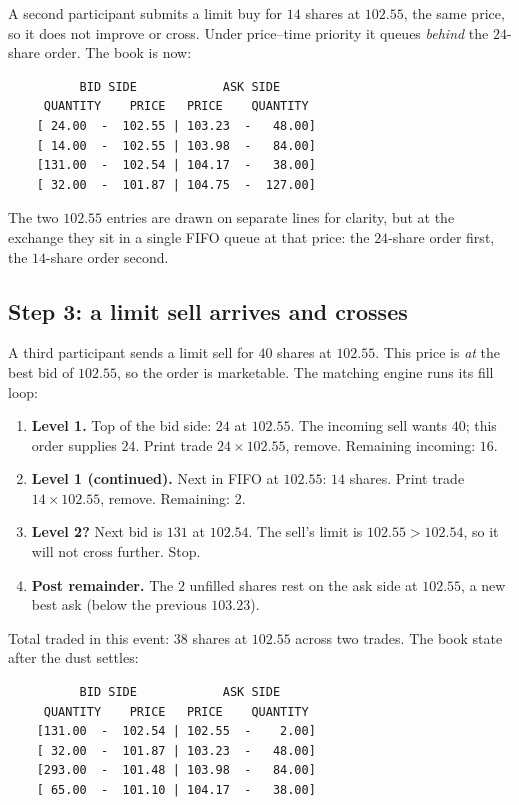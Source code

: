 A second participant submits a limit buy for $14$ shares at
$102.55$, the same price, so it does not improve or cross. Under price--time
priority it queues \emph{behind} the $24$-share order. The book is
now:

\begin{verbatim}
          BID SIDE            ASK SIDE
     QUANTITY    PRICE   PRICE    QUANTITY
    [ 24.00  -  102.55 | 103.23  -   48.00]
    [ 14.00  -  102.55 | 103.98  -   84.00]
    [131.00  -  102.54 | 104.17  -   38.00]
    [ 32.00  -  101.87 | 104.75  -  127.00]
\end{verbatim}

The two $102.55$ entries are drawn on separate lines for clarity, but
at the exchange they sit in a single FIFO queue at that price: the
$24$-share order first, the $14$-share order second.

\subsection{Step 3: a limit sell arrives and crosses}

A third participant sends a limit sell for $40$ shares at $102.55$.
This price is \emph{at} the best bid of $102.55$, so the order is
marketable. The matching engine runs its fill loop:

\begin{enumerate}
  \item \textbf{Level 1.} Top of the bid side: $24$ at $102.55$. The
  incoming sell wants $40$; this order supplies $24$. Print trade
  $24 \times 102.55$, remove. Remaining incoming: $16$.
  \item \textbf{Level 1 (continued).} Next in FIFO at $102.55$: $14$
  shares. Print trade $14 \times 102.55$, remove. Remaining: $2$.
  \item \textbf{Level 2?} Next bid is $131$ at $102.54$. The sell's
  limit is $102.55 > 102.54$, so it will not cross further. Stop.
  \item \textbf{Post remainder.} The $2$ unfilled shares rest on the
  ask side at $102.55$, a new best ask (below the previous $103.23$).
\end{enumerate}

Total traded in this event: $38$ shares at $102.55$ across two
trades. The book state after the dust settles:

\begin{verbatim}
          BID SIDE            ASK SIDE
     QUANTITY    PRICE   PRICE    QUANTITY
    [131.00  -  102.54 | 102.55  -    2.00]
    [ 32.00  -  101.87 | 103.23  -   48.00]
    [293.00  -  101.48 | 103.98  -   84.00]
    [ 65.00  -  101.10 | 104.17  -   38.00]
\end{verbatim}

